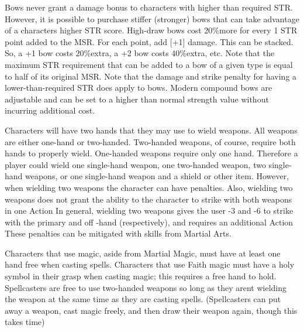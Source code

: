 \documentclass[twoside]{book}
\begin{document}
  
  

  

  
    {  
    Bows never grant a damage bonus to characters with higher than required STR. However, it is possible to purchase stiffer (stronger) bows that can take advantage of a characters higher STR score. High-draw bows cost 20\%more for every 1 STR point added to the MSR. For each point, add [+1] damage. This can be stacked. So, a +1 bow costs 20\%extra, a +2 bow costs 40\%extra, etc. Note that the maximum STR requirement that can be added to a bow of a given type is equal to half of its original MSR. Note that the damage and strike penalty for having a lower-than-required STR does apply to bows. Modern compound bows are adjustable and can be set to a higher than normal strength value without incurring additional cost.
    }
  
    {  
    Characters will have two hands that they may use to wield weapons. All weapons are either one-hand or two-handed. Two-handed weapons, of course, require both hands to properly wield. One-handed weapons require only one hand. Therefore a player could wield one single-hand weapon, one two-handed weapon, two single-hand weapons, or one single-hand weapon and a shield or other item. However, when wielding two weapons the character can have penalties. Also, wielding two weapons does not grant the ability to the character to strike with both weapons in one Action In general, wielding two weapons gives the user -3 and -6 to strike with the primary and off -hand (respectively), and requires an additional Action These penalties can be mitigated with skills from Martial Arts.
    }
  
    {  
    Characters that use magic, aside from Martial Magic, must have at least one hand free when casting spells. Characters that use Faith magic must have a holy symbol in their grasp when casting magic; this requires a free hand to hold. Spellcasters are free to use two-handed weapons so long as they arent wielding the weapon at the same time as they are casting spells. (Spellcasters can put away a weapon, cast magic freely, and then draw their weapon again, though this takes time)
    }
  
\end{document}
